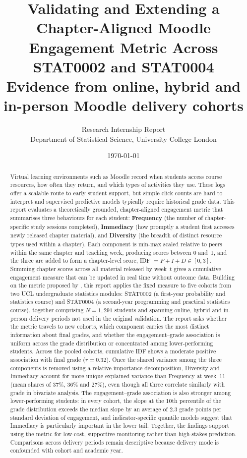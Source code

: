 \documentclass[11pt,a4paper]{article}
\title{\bfseries Validating and Extending a Chapter-Aligned Moodle\\[2pt]
Engagement Metric Across STAT0002 and STAT0004\\[8pt]
\large Evidence from online, hybrid and in-person Moodle delivery cohorts}
\author{Research Internship Report\\
Department of Statistical Science, University College London}
\date{\today}
\begin{document}
\maketitle

\begin{abstract}
\noindent
Virtual learning environments such as Moodle record when students access course
resources, how often they return, and which types of activities they use. These
logs offer a scalable route to early student support, but simple click counts are
hard to interpret and supervised predictive models typically require historical
grade data. This report evaluates a theoretically grounded, chapter-aligned
engagement metric that summarises three behaviours for each student:
\textbf{Frequency} (the number of chapter-specific study sessions completed),
\textbf{Immediacy} (how promptly a student first accesses newly released chapter
material), and \textbf{Diversity} (the breadth of distinct resource types used
within a chapter). Each component is min-max scaled relative to peers within the
same chapter and teaching week, producing scores between 0 and~1, and the three
are added to form a chapter-level score, IDF $= F + I + D \in [0, 3]$. Summing
chapter scores across all material released by week~$t$ gives a cumulative
engagement measure that can be updated in real time without outcome data.
Building on the metric proposed by \citet{johnston2025}, this report applies
the fixed measure to five cohorts from two UCL undergraduate statistics modules:
STAT0002 (a first-year probability and statistics course) and STAT0004 (a
second-year programming and practical statistics course), together comprising $N = 1{,}291$
students and spanning online, hybrid and in-person delivery periods not used in
the original validation. The report asks whether the metric travels to new
cohorts, which component carries the most distinct information about final
grades, and whether the engagement--grade association is uniform across the grade
distribution or concentrated among lower-performing students.
Across the pooled cohorts, cumulative IDF shows a moderate positive association
with final grade ($r = 0.32$). Once the shared variance among the three
components is removed using a relative-importance decomposition, Diversity and
Immediacy account for more unique explained variance than Frequency at week~11
(mean shares of 37\%, 36\% and 27\%), even though all three correlate similarly
with grade in bivariate analysis. The engagement--grade association is also
stronger among lower-performing students: in every cohort, the slope at the
10th percentile of the grade distribution exceeds the median slope by an average
of 2.3 grade points per standard deviation of engagement, and indicator-specific
quantile models suggest that Immediacy is particularly important in the lower
tail. Together, the findings support using the metric for low-cost, supportive
monitoring rather than high-stakes prediction. Comparisons across delivery
periods remain descriptive because delivery mode is confounded with cohort and
academic year.
\end{abstract}
\end{document}

